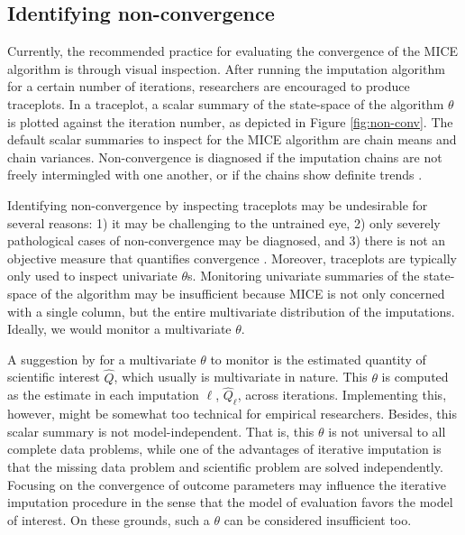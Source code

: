 \documentclass[Royal,times,sageh]{sagej}
\begin{document}
\hypertarget{identifying-non-convergence}{%
\subsection{Identifying non-convergence}\label{identifying-non-convergence}}

Currently, the recommended practice for evaluating the convergence of the MICE algorithm is through visual inspection. After running the imputation algorithm for a certain number of iterations, researchers are encouraged to produce traceplots. In a traceplot, a scalar summary of the state-space of the algorithm \(\theta\) is plotted against the iteration number, as depicted in Figure \ref{fig:non-conv}. The default scalar summaries to inspect for the MICE algorithm are chain means and chain variances. Non-convergence is diagnosed if the imputation chains are not freely intermingled with one another, or if the chains show definite trends \citep{buur18}.

Identifying non-convergence by inspecting traceplots may be undesirable for several reasons: 1) it may be challenging to the untrained eye, 2) only severely pathological cases of non-convergence may be diagnosed, and 3) there is not an objective measure that quantifies convergence \citep[\(\S\) 6.5.2]{buur18}. Moreover, traceplots are typically only used to inspect univariate \(\theta\)s. Monitoring univariate summaries of the state-space of the algorithm may be insufficient because MICE is not only concerned with a single column, but the entire multivariate distribution of the imputations. Ideally, we would monitor a multivariate \(\theta\).

A suggestion by \citet{buur18} for a multivariate \(\theta\) to monitor is the estimated quantity of scientific interest \(\hat{Q}\), which usually is multivariate in nature. This \(\theta\) is computed as the estimate in each imputation \(\ell\), \(\hat{Q}_\ell\), across iterations. Implementing this, however, might be somewhat too technical for empirical researchers. Besides, this scalar summary is not model-independent. That is, this \(\theta\) is not universal to all complete data problems, while one of the advantages of iterative imputation is that the missing data problem and scientific problem are solved independently. Focusing on the convergence of outcome parameters may influence the iterative imputation procedure in the sense that the model of evaluation favors the model of interest. On these grounds, such a \(\theta\) can be considered insufficient too.
\end{document}
